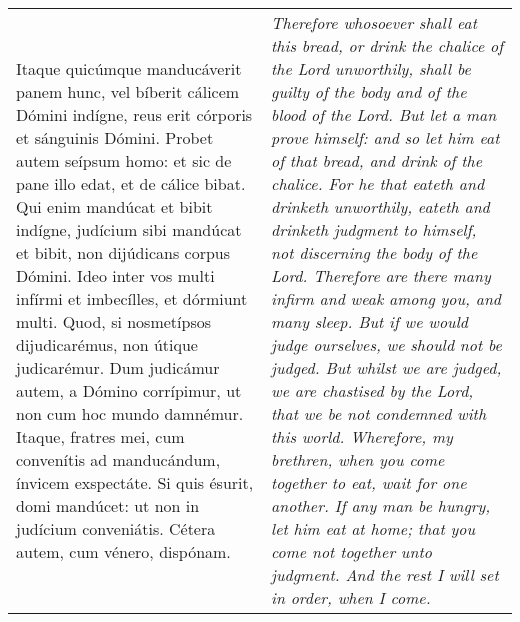 \begin{tabular}{p{8cm} | p{8cm}}
Itaque quicúmque manducáverit panem hunc, vel bíberit cálicem Dómini indígne, reus erit córporis et sánguinis Dómini.
Probet autem seípsum homo: et sic de pane illo edat, et de cálice bibat.
Qui enim mandúcat et bibit indígne, judícium sibi mandúcat et bibit, non dijúdicans corpus Dómini.
Ideo inter vos multi infírmi et imbecílles, et dórmiunt multi.
Quod, si nosmetípsos dijudicarémus, non útique judicarémur.
Dum judicámur autem, a Dómino corrípimur, ut non cum hoc mundo damnémur.
Itaque, fratres mei, cum convenítis ad manducándum, ínvicem exspectáte.
Si quis ésurit, domi mandúcet: ut non in judícium conveniátis. Cétera autem, cum vénero, dispónam.
& \textit{Therefore whosoever shall eat this bread, or drink the chalice of the Lord unworthily, shall be guilty of the body and of the blood of the Lord.
But let a man prove himself: and so let him eat of that bread, and drink of the chalice.
For he that eateth and drinketh unworthily, eateth and drinketh judgment to himself, not discerning the body of the Lord.
Therefore are there many infirm and weak among you, and many sleep.
But if we would judge ourselves, we should not be judged.
But whilst we are judged, we are chastised by the Lord, that we be not condemned with this world.
Wherefore, my brethren, when you come together to eat, wait for one another.
If any man be hungry, let him eat at home; that you come not together unto judgment. And the rest I will set in order, when I come.}
\end{tabular}